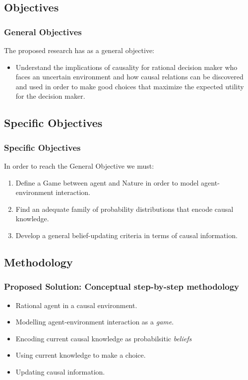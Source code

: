 \documentclass{beamer}
\theoremstyle{plain}
\begin{document}
	\subsection{Objectives}
	\begin{frame}
	\frametitle{General Objectives}
	The proposed research has as a general objective:
	\begin{itemize}
 \item Understand the implications of causality for rational decision maker who faces an uncertain environment and how causal relations can be discovered and used in order to make good choices that maximize the expected utility for the decision maker.
	\end{itemize}
	\end{frame}
	
	\subsection{Specific Objectives}
	\begin{frame}
	\frametitle{Specific Objectives}
	In order to reach the General Objective we must:
	\begin{enumerate}
	\item Define a Game between agent and Nature in order to model agent-environment interaction.
	\item Find an adequate family of probability distributions that encode causal knowledge.
	\item Develop a general belief-updating criteria in terms of causal information.
	\end{enumerate}
	\end{frame}

\subsection{Methodology}
\begin{frame}
\frametitle{Proposed Solution: Conceptual step-by-step methodology}
\begin{itemize}
\item Rational agent in a causal environment.
\item Modelling agent-environment interaction as a \textit{game}.
\item Encoding current causal knowledge as probabilsitic \textit{beliefs}
\item Using current knowledge to make a choice.
\item Updating causal information.
\end{itemize}
\end{frame}
\end{document}
